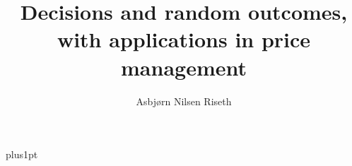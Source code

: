 \documentclass[12pt,fleqn]{ociamthesis}
\title{Decisions and random outcomes, with applications in price management}
\author{Asbj{\o}rn Nilsen Riseth}
\def\biblio{}
\def\chtodolist{\listoftodos}
\begin{document}
\def\biblio{} %
\def\chtodolist{}

\baselineskip=18pt plus1pt

\setcounter{secnumdepth}{3}
\setcounter{tocdepth}{3}


\maketitle                  %
\begin{dedication}
\end{dedication}

\begin{acknowledgementslong}
\end{acknowledgementslong}

\begin{abstractseparate}
\end{abstractseparate}

\begin{originalitylong}
  
\end{originalitylong}

\begin{romanpages}          %
  \listoftodos
  \tableofcontents            %
  \listoffigures              %
  \listoftables               %
\end{romanpages}            %












\appendix



\end{document}
